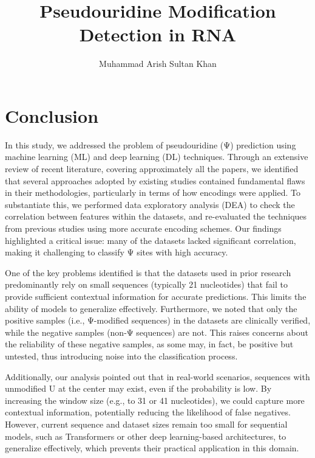 \documentclass[12pt]{book}
\begin{document}
  \title{Pseudouridine Modification Detection in RNA}
  \author{Muhammad Arish Sultan Khan}

  \maketitle

  \tableofcontents
  \newpage


  
  
  
  


  \chapter{Conclusion}\label{ch:conclusion}
    In this study, we addressed the problem of pseudouridine (Ψ) prediction using machine learning (ML) and deep learning (DL) techniques. Through an extensive review of recent literature, covering approximately all the papers, we identified that several approaches adopted by existing studies contained fundamental flaws in their methodologies, particularly in terms of how encodings were applied. To substantiate this, we performed data exploratory analysis (DEA) to check the correlation between features within the datasets, and re-evaluated the techniques from previous studies using more accurate encoding schemes. Our findings highlighted a critical issue: many of the datasets lacked significant correlation, making it challenging to classify Ψ sites with high accuracy.

    One of the key problems identified is that the datasets used in prior research predominantly rely on small sequences (typically 21 nucleotides) that fail to provide sufficient contextual information for accurate predictions. This limits the ability of models to generalize effectively. Furthermore, we noted that only the positive samples (i.e., Ψ-modified sequences) in the datasets are clinically verified, while the negative samples (non-Ψ sequences) are not. This raises concerns about the reliability of these negative samples, as some may, in fact, be positive but untested, thus introducing noise into the classification process.

    Additionally, our analysis pointed out that in real-world scenarios, sequences with unmodified U at the center may exist, even if the probability is low. By increasing the window size (e.g., to 31 or 41 nucleotides), we could capture more contextual information, potentially reducing the likelihood of false negatives. However, current sequence and dataset sizes remain too small for sequential models, such as Transformers or other deep learning-based architectures, to generalize effectively, which prevents their practical application in this domain.
\end{document}
